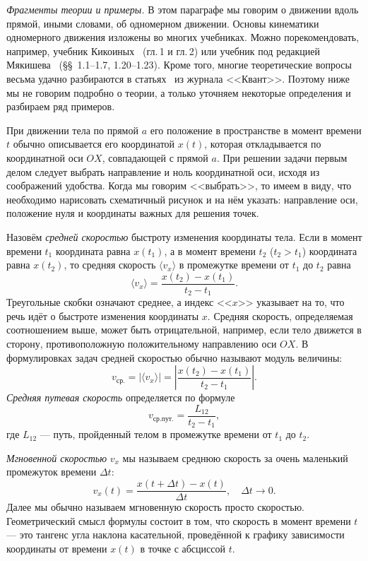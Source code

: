 \documentclass[../main.tex]{subfiles}
\begin{document}

\textit{Фрагменты теории и примеры.} В этом параграфе мы говорим о движении вдоль прямой, иными словами, об одномерном движении. Основы кинематики одномерного движения изложены во многих учебниках. Можно порекомендовать, например, учебник Кикоиных~\cite{Kikoin} (гл.\,1 и гл.\,2) или учебник под редакцией Мякишева~\cite{Balashov} (\S\S~1.1--1.7, 1.20--1.23). Кроме того, многие теоретические вопросы весьма удачно разбираются в статьях~\cite{Kik_art_1, Kik_art_2, Average_velocity, bondarov_1} из журнала <<Квант>>. Поэтому ниже мы не говорим подробно о теории, а только уточняем некоторые определения и разбираем ряд примеров.

При движении тела по прямой $a$ его положение в пространстве в момент времени $t$ обычно описывается его координатой $x(t)$, которая откладывается по координатной оси $OX$, совпадающей с прямой $a$. При решении задачи первым делом следует выбрать направление и ноль координатной оси, исходя из соображений удобства. Когда мы говорим <<выбрать>>, то имеем в виду, что необходимо нарисовать схематичный рисунок и на нём указать: направление оси, положение нуля и координаты важных для решения точек.

Назовём \textit{средней скоростью} быстроту изменения координаты тела. Если в момент времени $t_{1}$ координата равна $x(t_{1})$, а в момент времени $t_{2}$ ($t_{2} > t_{1}$) координата равна $x(t_{2})$, то средняя скорость $\langle v_{x} \rangle$ в промежутке времени от $t_{1}$ до $t_{2}$ равна
\[
\langle v_{x} \rangle= \frac{x(t_{2})- x(t_{1})}{t_{2}-t_{1}}.
\]
Треугольные скобки означают среднее, а индекс <<$x$>> указывает на то, что речь идёт о быстроте изменения координаты $x$. Средняя скорость, определяемая соотношением выше, может быть отрицательной, например, если тело движется в сторону, противоположную положительному направлению оси $OX$. В формулировках задач средней скоростью обычно называют модуль величины:
\[
v_{\text{ср.}} = |\langle v_{x} \rangle|=\left| \frac{x(t_{2})- x(t_{1})}{t_{2}-t_{1}} \right|.
\]
\textit{Средняя путевая скорость} определяется по формуле
\[
v_{\text{ср.пут.}} = \frac{L_{12}}{t_{2}-t_{1}},
\]
где $L_{12}$ --- путь, пройденный телом в промежутке времени от $t_{1}$ до $t_{2}$.

\textit{Мгновенной скоростью} $v_{x}$ мы называем среднюю скорость за очень маленький промежуток времени $\Delta t$:
\[
v_{x}(t) = \frac{x(t+\Delta t)- x(t)}{\Delta t}, \quad \Delta t\rightarrow 0.
\]
Далее мы обычно называем мгновенную скорость просто скоростью. Геометрический смысл формулы состоит в том, что скорость в момент времени $t$ --- это тангенс угла наклона касательной, проведённой к графику зависимости координаты от времени $x(t)$ в точке с абсциссой $t$.
\end{document}
